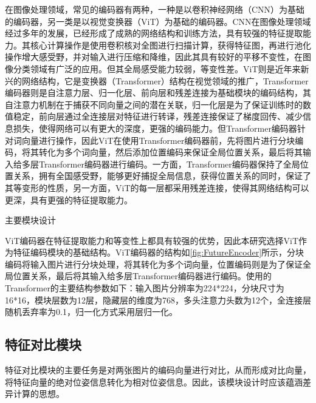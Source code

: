 \documentclass{Diploma}
\begin{document}
  在图像处理领域，常见的编码器有两种，一种是以卷积神经网络（CNN）为基础的编码器，另一类是以视觉变换器（ViT）为基础的编码器。CNN在图像处理领域经过多年的发展，已经形成了成熟的网络结构和训练方法，具有较强的特征提取能力。其核心计算操作是使用卷积核对全图进行扫描计算，获得特征图，再进行池化操作增大感受野，并对输入进行压缩和降维，因此其具有较好的平移不变性，在图像分类领域有广泛的应用\cite{he2016deep}。但其全局感受能力较弱，等变性差。ViT则是近年来新兴的网络结构，它是变换器（Transformer）结构在视觉领域的推广\cite{dosovitskiy2020image}，Transformer编码器则是自注意力层、归一化层、前向层和残差连接为基础模块的编码结构，其自注意力机制在于捕获不同向量之间的潜在关联，归一化层是为了保证训练时的数值稳定，前向层通过全连接层对特征进行转译，残差连接保证了梯度回传、减少信息损失，使得网络可以有更大的深度，更强的编码能力\cite{vaswani2017attention}。但Transformer编码器针对词向量进行操作，因此ViT在使用Transformer编码器前，先将图片进行分块编码，将其转化为多个词向量，然后添加位置编码来保证全局位置关系，最后将其输入给多层Transformer编码器进行编码。一方面，Transformer编码器保持了全局位置关系，拥有全国感受野，能够更好捕捉全局信息，获得位置关系的同时，保证了其等变形的性质，另一方面，ViT的每一层都采用残差连接，使得其网络结构可以更深，具有更强的特征提取能力。

\begin{subfigures}[submodules]{主要模块设计}
\end{subfigures}

ViT编码器在特征提取能力和等变性上都具有较强的优势，因此本研究选择ViT作为特征编码模块的基础结构。ViT编码器的结构如\ref{fig:FutureEncoder}所示，分块编码将输入图片进行分块处理，将其转化为多个词向量，位置编码则是为了保证全局位置关系，最后将其输入给多层Transformer编码器进行编码。使用的Transformer的主要结构参数如下：输入图片分辨率为224*224，分块尺寸为16*16，模块层数为12层，隐藏层的维度为768，多头注意力头数为12个，全连接层随机丢弃率为0.1，归一化方式采用层归一化。
\subsection{特征对比模块}
特征对比模块的主要任务是对两张图片的编码向量进行对比，从而形成对比向量，将特征向量的绝对位姿信息转化为相对位姿信息。因此，该模块设计时应该蕴涵差异计算的思想。
\end{document}
